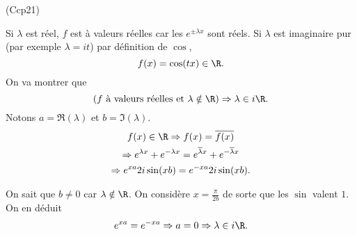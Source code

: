 \begin{tiny}(Ccp21)\end{tiny} Si $\lambda$ est réel, $f$ est à valeurs réelles car les $e^{\pm \lambda x}$ sont réels. Si $\lambda$ est imaginaire pur (par exemple $\lambda = it$) par définition de $\cos$,
\[
  f(x) = \cos (tx) \in \R.
\]
On va montrer que 
\[
  \left( f \text{ à  valeurs réelles et } \lambda \notin \R \right) \Rightarrow \lambda \in i\R.
\]
Notons $a = \Re(\lambda)$ et $b = \Im(\lambda)$. 
\begin{multline*}
  f(x) \in \R 
  \Rightarrow f(x) = \overline{f(x)}\\
  \Rightarrow e^{\lambda x} + e^{-\lambda x} = e^{\overline{\lambda} x} + e^{-\overline{\lambda } x}\\
  \Rightarrow e^{x a} 2i\sin(x b) = e^{-x a} 2i\sin(x b). 
\end{multline*}

On sait que $b\neq 0$ car $\lambda \notin \R$. On considère $x = \frac{\pi}{2b}$ de sorte que les $\sin$ valent $1$. On en déduit
\[
 e^{x a} = e^{-x a} \Rightarrow a = 0 \Rightarrow \lambda \in i\R. 
\]
